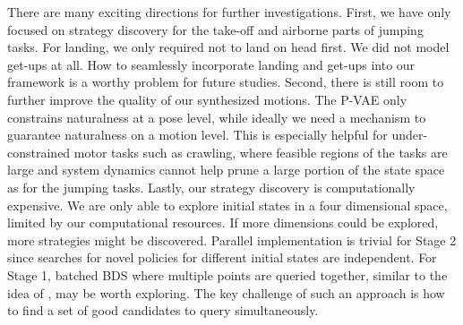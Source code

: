 There are many exciting directions for further investigations. First, we have only focused on strategy discovery for the take-off and airborne parts of jumping tasks. For landing, we only required not to land on head first. We did not model get-ups at all. How to seamlessly incorporate landing and get-ups into our framework is a worthy problem for future studies. Second, there is still room to further improve the quality of our synthesized motions. The P-VAE only constrains naturalness at a pose level, while ideally we need a mechanism to guarantee naturalness on a motion level. This is especially helpful for under-constrained motor tasks such as crawling, where feasible regions of the tasks are large and system dynamics cannot help prune a large portion of the state space as for the jumping tasks. Lastly, our strategy discovery is computationally expensive. We are only able to explore initial states in a four dimensional space, limited by our computational resources. If more dimensions could be explored, more strategies might be discovered. Parallel implementation is trivial for Stage 2 since searches for novel policies for different initial states are independent. For Stage 1, batched BDS where multiple points are queried together, similar to the idea of \cite{azimi2010batch}, may be worth exploring. The key challenge of such an approach is how to find a set of good candidates to query simultaneously.